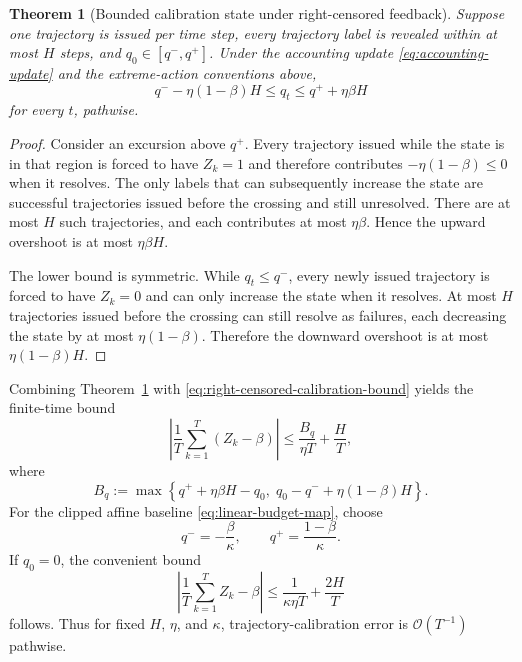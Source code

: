 \documentclass[11pt]{article}
\newtheorem{theorem}{Theorem}
\begin{document}
\begin{theorem}[Bounded calibration state under right-censored feedback]
\label{thm:bounded-q}
Suppose one trajectory is issued per time step, every trajectory label is
revealed within at most $H$ steps, and $q_0\in[q^-,q^+]$.  Under the accounting
update \eqref{eq:accounting-update} and the extreme-action conventions above,
\begin{equation}
    \boxed{
    q^--\eta(1-\beta)H
    \le
    q_t
    \le
    q^++\eta\beta H
    }
    \label{eq:q-bounded}
\end{equation}
for every $t$, pathwise.
\end{theorem}

\begin{proof}
Consider an excursion above $q^+$.  Every trajectory issued while the state is
in that region is forced to have $Z_k=1$ and therefore contributes
$-\eta(1-\beta)\le0$ when it resolves.  The only labels that can subsequently
increase the state are successful trajectories issued before the crossing and
still unresolved.  There are at most $H$ such trajectories, and each contributes
at most $\eta\beta$.  Hence the upward overshoot is at most $\eta\beta H$.

The lower bound is symmetric.  While $q_t\le q^-$, every newly issued
trajectory is forced to have $Z_k=0$ and can only increase the state when it
resolves.  At most $H$ trajectories issued before the crossing can still resolve
as failures, each decreasing the state by at most $\eta(1-\beta)$.  Therefore
the downward overshoot is at most $\eta(1-\beta)H$.
\end{proof}

Combining Theorem~\ref{thm:bounded-q} with
\eqref{eq:right-censored-calibration-bound} yields the finite-time bound
\begin{equation}
    \left|
        \frac1T\sum_{k=1}^T(Z_k-\beta)
    \right|
    \le
    \frac{B_q}{\eta T}
    +
    \frac HT,
    \label{eq:finite-time-calibration}
\end{equation}
where
\[
    B_q
    :=
    \max\left\{
        q^++\eta\beta H-q_0,
        \;
        q_0-q^-+\eta(1-\beta)H
    \right\}.
\]
For the clipped affine baseline \eqref{eq:linear-budget-map}, choose
\[
    q^-=-\frac{\beta}{\kappa},
    \qquad
    q^+=\frac{1-\beta}{\kappa}.
\]
If $q_0=0$, the convenient bound
\begin{equation}
    \boxed{
    \left|
        \frac1T\sum_{k=1}^T Z_k-\beta
    \right|
    \le
    \frac{1}{\kappa\eta T}
    +
    \frac{2H}{T}
    }
    \label{eq:affine-budget-calibration}
\end{equation}
follows.  Thus for fixed $H$, $\eta$, and $\kappa$, trajectory-calibration error
is $\mathcal O(T^{-1})$ pathwise.
\end{document}
